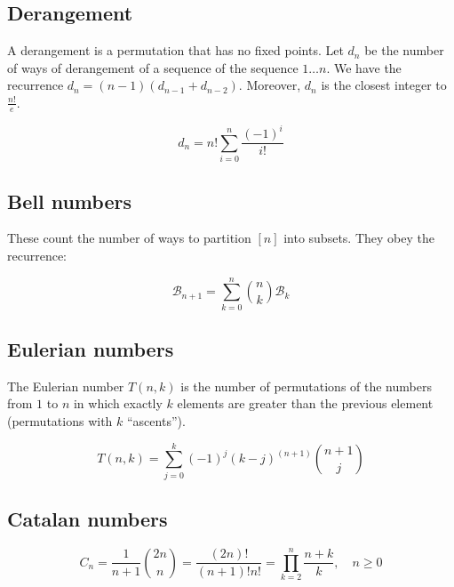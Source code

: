 \subsection{Derangement} A derangement is a permutation that has no fixed points. 
Let $d_n$ be the number of ways of derangement of a sequence of the sequence $1\dots n$. 
We have the recurrence $d_n=(n-1)(d_{n-1}+d_{n-2})$. Moreover, $d_n$ is the closest integer to $\frac{n!}{e}$.

$$d_n = n!\sum_{i=0}^{n}\frac{(-1)^i}{i!}$$


\subsection{Bell numbers} These count the number of ways to partition $[n]$ into subsets. 
They obey the recurrence:

\begin{equation*}
    \mathcal{B}_{n+1} = \sum_{k=0}^n \binom{n}{k} \mathcal{B}_k
\end{equation*}


\subsection{Eulerian numbers} 
The Eulerian number $T(n,k)$ is the number of permutations of the numbers from $1$ to $n$ in which exactly $k$ elements are greater than the previous element (permutations with $k$ ``ascents'').


$$ T(n,k) = \sum_{j = 0}^k (-1)^j (k-j)^{(n+1)} \binom{n+1}{j}$$


\subsection{Catalan numbers}
$$C_n = \frac{1}{n+1}\binom{2n}{n} = \frac{(2n)!}{(n+1)!n!} = \prod_{k=2}^{n} \frac{n+k}{k}, \quad n \geq 0$$\\

